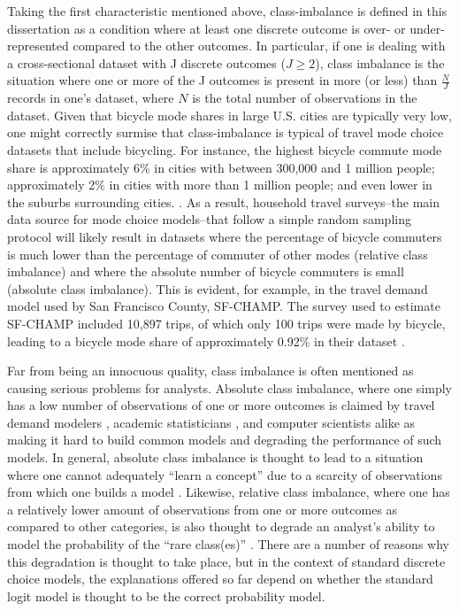 \documentclass{article}
\begin{document}
Taking the first characteristic mentioned above, class-imbalance is defined in this dissertation as a condition where at least one discrete outcome is over- or under-represented compared to the other outcomes. In particular, if one is dealing with a cross-sectional dataset with J discrete outcomes ($J \geq 2$), class imbalance is the situation where one or more of the J outcomes is present in more (or less) than $\frac{N}{J}$  records in one's dataset, where $N$ is the total number of observations in the dataset. Given that bicycle mode shares in large U.S. cities are typically very low, one might correctly surmise that class-imbalance is typical of travel mode choice datasets that include bicycling. For instance, the highest bicycle commute mode share is approximately 6\% in cities with between 300,000 and 1 million people; approximately 2\% in cities with more than 1 million people; and even lower in the suburbs surrounding cities. \citep{league_of_american_bicyclists_where_2014}. As a result, household travel surveys--the main data source for mode choice models--that follow a simple random sampling protocol will likely result in datasets where the percentage of bicycle commuters is much lower than the percentage of commuter of other modes (relative class imbalance) and where the absolute number of bicycle commuters is small (absolute class imbalance). This is evident, for example, in the travel demand model used by San Francisco County, SF-CHAMP. The survey used to estimate SF-CHAMP included 10,897 trips, of which only 100 trips were made by bicycle, leading to a bicycle mode share of approximately 0.92\% in their dataset \citep{cambridge_systematics_san_2002}.

Far from being an innocuous quality, class imbalance is often mentioned as causing serious problems for analysts. Absolute class imbalance, where one simply has a low number of observations of one or more outcomes is claimed by travel demand modelers \citep{parsons_brinckerhoff_quade_&_douglas_transportation_2005}, academic statisticians \citep{chen_using_2004}, and computer scientists \citep{weiss_mining_2004, he_learning_2009} alike as making it hard to build common models and degrading the performance of such models. In general, absolute class imbalance is thought to lead to a situation where one cannot adequately ``learn a concept'' due to a scarcity of observations from which one builds a model \citep{weiss_mining_2004, he_learning_2009}. Likewise, relative class imbalance, where one has a relatively lower amount of observations from one or more outcomes as compared to other categories, is also thought to degrade an analyst's ability to model the probability of the ``rare class(es)'' \citep{cramer_predictive_1999, king_logistic_2001, japkowicz_class_2000, wallace_class_2011}. There are a number of reasons why this degradation is thought to take place, but in the context of standard discrete choice models, the explanations offered so far depend on whether the standard logit model is thought to be the correct probability model.
\end{document}
